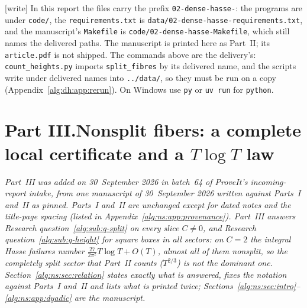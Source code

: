 \documentclass[11pt]{article}
\numberwithin{equation}{section}
\theoremstyle{plain}
\theoremstyle{plain}
\theoremstyle{plain}
\theoremstyle{definition}
\theoremstyle{definition}
\theoremstyle{definition}
\theoremstyle{remark}
\newcommand{\wtag}{\textup{[write]}}%
\newcommand{\rpath}[1]{\nolinkurl{#1}}
\begin{document}
\wtag{} In this report the files carry the prefix
\texttt{02-dense-hasse-}: the programs are under \rpath{code/}, the
\texttt{requirements.txt} is \rpath{data/02-dense-hasse-requirements.txt},
and the manuscript's \texttt{Makefile} is
\rpath{code/02-dense-hasse-Makefile}, which still names the delivered
paths. The manuscript is printed here as Part~II; its \texttt{article.pdf}
is not shipped. The commands above are the delivery's:
\texttt{count\_heights.py} imports \texttt{split\_fibres} by its
delivered name, and the scripts write under delivered names into
\rpath{../data/}, so they must be run on a copy
(Appendix~\ref{alg:dh:app:rerun}). On Windows use \texttt{py} or
\texttt{uv run} for \texttt{python}.

\clearpage
{}\part*{Part III.\quad Nonsplit fibers: a complete local certificate and a $T\log T$ law}

\noindent\emph{Part~III was added on 30~September 2026 in batch~64 of
ProveIt's incoming-report intake, from one manuscript of 30~September
2026 written against Parts~I and~II as pinned. Parts~I and~II are
unchanged except for dated notes and the title-page spacing (listed in
Appendix~\ref{alg:ns:app:provenance}). Part~III answers Research
question~\ref{alg:sub:q-split} on every slice $C\ne0$, and Research
question~\ref{alg:sub:q-height} for square boxes in all sectors: on
$C=2$ the integral Hasse failures number
$\frac{27}{2\pi^2}T\log T+O(T)$, almost all of them nonsplit, so the
completely split sector that Part~II counts ($T^{2/3}$) is not the
dominant one. Section~\ref{alg:ns:sec:relation} states exactly what is
answered, fixes the notation against Parts~I and~II and lists what is
printed twice; Sections~\ref{alg:ns:sec:intro}--\ref{alg:ns:app:dyadic}
are the manuscript.}
\end{document}
